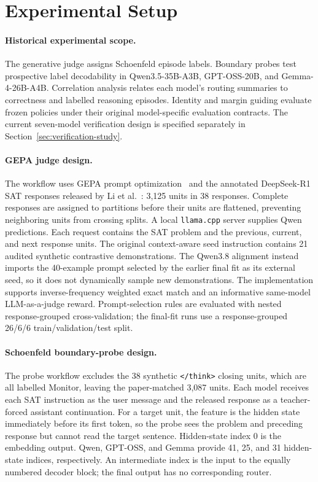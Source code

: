 \section{Experimental Setup}

\paragraph{Historical experimental scope.}
The generative judge assigns Schoenfeld episode labels. Boundary probes test
prospective label decodability in Qwen3.5-35B-A3B, GPT-OSS-20B, and
Gemma-4-26B-A4B. Correlation analysis relates each model's routing summaries
to correctness and labelled reasoning episodes. Identity and margin guiding
evaluate frozen policies under their original model-specific evaluation
contracts. The current seven-model verification design is specified
separately in Section~\ref{sec:verification-study}.

\paragraph{GEPA judge design.}
The workflow uses GEPA prompt optimization~\cite{agrawal2026gepa}
and the annotated DeepSeek-R1 SAT responses released by
Li et al.~\cite{li2025schoenfeld}: 3,125 units in 38 responses.  Complete responses are assigned to partitions before their
units are flattened, preventing neighboring units from crossing splits.  A
local \texttt{llama.cpp} server supplies Qwen predictions.  Each request
contains the SAT problem and the previous, current, and next response units.
The original context-aware seed instruction contains 21 audited synthetic
contrastive demonstrations.  The Qwen3.8 alignment instead imports the
40-example prompt selected by the earlier final fit as its external seed, so
it does not dynamically sample new demonstrations.  The implementation
supports inverse-frequency weighted exact match and an informative same-model
LLM-as-a-judge reward.  Prompt-selection rules are evaluated with nested
response-grouped cross-validation; the final-fit runs use a response-grouped
26/6/6 train/validation/test split.

\paragraph{Schoenfeld boundary-probe design.}
The probe workflow excludes the 38 synthetic \texttt{</think>} closing units,
which are all labelled Monitor, leaving the paper-matched 3,087 units. Each model
receives each SAT instruction as the user message and the released response as
a teacher-forced assistant continuation.  For a target unit, the feature is
the hidden state immediately before its first token, so the probe sees the
problem and preceding response but cannot read the target sentence.  Hidden-state index 0 is the embedding output. Qwen, GPT-OSS, and Gemma
provide 41, 25, and 31 hidden-state indices, respectively. An intermediate
index is the input to the equally numbered decoder block; the final output
has no corresponding router.

